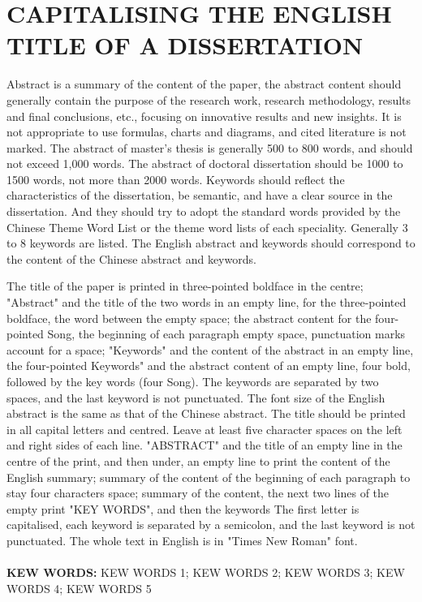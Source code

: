 \documentclass[UTF8,12pt,AutoFakeBold]{ctexart}
\begin{document}
\section*{CAPITALISING THE ENGLISH TITLE OF A DISSERTATION}
\begin{enabstract}
    \fontsize{14pt}{17.5pt}\selectfont%
    
    Abstract is a summary of the content of the paper, the abstract content should generally contain the purpose of the research work, research methodology, results and final conclusions, etc., focusing on innovative results and new insights. It is not appropriate to use formulas, charts and diagrams, and cited literature is not marked. The abstract of master's thesis is generally 500 to 800 words, and should not exceed 1,000 words. The abstract of doctoral dissertation should be 1000 to 1500 words, not more than 2000 words. Keywords should reflect the characteristics of the dissertation, be semantic, and have a clear source in the dissertation. And they should try to adopt the standard words provided by the Chinese Theme Word List or the theme word lists of each speciality. Generally 3 to 8 keywords are listed. The English abstract and keywords should correspond to the content of the Chinese abstract and keywords.
    \par
    The title of the paper is printed in three-pointed boldface in the centre; "Abstract" and the title of the two words in an empty line, for the three-pointed boldface, the word between the empty space; the abstract content for the four-pointed Song, the beginning of each paragraph empty space, punctuation marks account for a space; "Keywords" and the content of the abstract in an empty line, the four-pointed Keywords" and the abstract content of an empty line, four bold, followed by the key words (four Song). The keywords are separated by two spaces, and the last keyword is not punctuated.
    The font size of the English abstract is the same as that of the Chinese abstract. The title should be printed in all capital letters and centred. Leave at least five character spaces on the left and right sides of each line. "ABSTRACT" and the title of an empty line in the centre of the print, and then under, an empty line to print the content of the English summary; summary of the content of the beginning of each paragraph to stay four characters space; summary of the content, the next two lines of the empty print "KEY WORDS", and then the keywords The first letter is capitalised, each keyword is separated by a semicolon, and the last keyword is not punctuated. The whole text in English is in "Times New Roman" font.
    \\
    \\
    \textbf{KEW WORDS:} KEW WORDS 1;  KEW WORDS 2;  KEW WORDS 3;  KEW WORDS 4;  KEW WORDS 5
\end{enabstract}
\pagebreak
\end{document}
